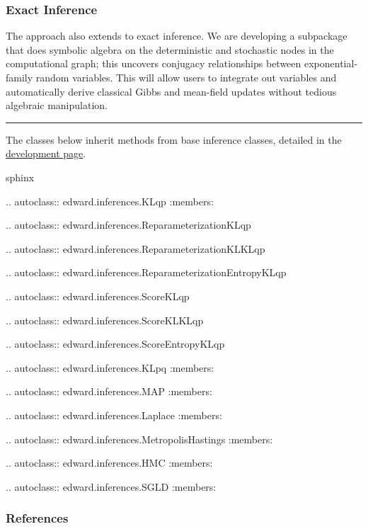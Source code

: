 \subsubsection{Exact Inference}

The approach also extends to exact inference. We are developing a
subpackage that does symbolic algebra on the deterministic and
stochastic nodes in the computational graph; this uncovers conjugacy
relationships between exponential-family random variables. This will
allow users to integrate out variables and automatically derive
classical Gibbs and mean-field updates \citep{bishop2006pattern} without
tedious algebraic manipulation.

\begin{center}\rule{3in}{0.4pt}\end{center}

The classes below inherit methods from base inference classes,
detailed in the \href{/api/inference-development}{development page}.

{{sphinx

.. autoclass:: edward.inferences.KLqp
   :members:

.. autoclass:: edward.inferences.ReparameterizationKLqp

.. autoclass:: edward.inferences.ReparameterizationKLKLqp

.. autoclass:: edward.inferences.ReparameterizationEntropyKLqp

.. autoclass:: edward.inferences.ScoreKLqp

.. autoclass:: edward.inferences.ScoreKLKLqp

.. autoclass:: edward.inferences.ScoreEntropyKLqp

.. autoclass:: edward.inferences.KLpq
   :members:

.. autoclass:: edward.inferences.MAP
   :members:

.. autoclass:: edward.inferences.Laplace
   :members:

.. autoclass:: edward.inferences.MetropolisHastings
   :members:

.. autoclass:: edward.inferences.HMC
   :members:

.. autoclass:: edward.inferences.SGLD
   :members:

}}

\subsubsection{References}\label{references}
